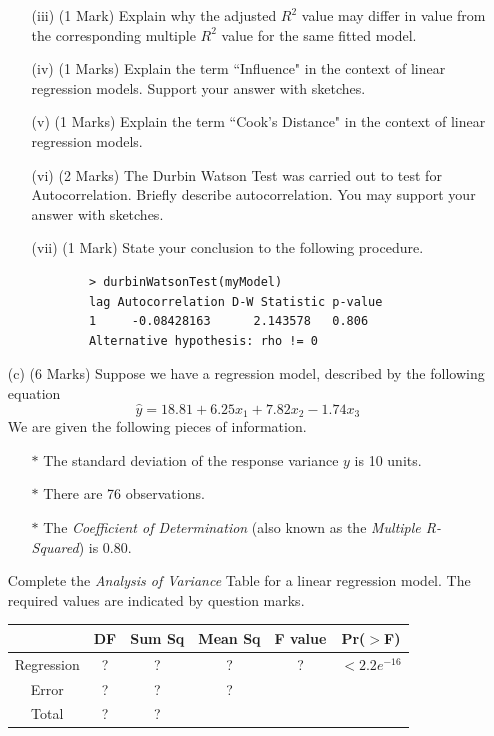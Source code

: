 \documentclass[a4paper,12pt]{article}
\begin{document}
\begin{itemize}
\begin{itemize}
	\item[(iii)] (1 Mark) Explain why the adjusted $R^2$ value may differ in value from the corresponding multiple $R^2$ value for the same fitted model.
	
	
	\item[(iv)] (1 Marks) Explain the term ``Influence" in the context of linear regression models. Support your answer with sketches.
	\item[(v)] (1 Marks) Explain the  term ``Cook's Distance" in the context of linear regression models. 
	
	
	
	\item[(vi)] (2 Marks)  The Durbin Watson Test was carried out to test for Autocorrelation. Briefly describe autocorrelation. You may support your answer with sketches.
	\item[(vii)] (1 Mark) State your conclusion to the following procedure.
	\begin{framed}
		\begin{verbatim}
		> durbinWatsonTest(myModel)
		lag Autocorrelation D-W Statistic p-value
		1     -0.08428163      2.143578   0.806
		Alternative hypothesis: rho != 0
		\end{verbatim}
	\end{framed}
\newpage
\end{itemize}
\item[(c)] (6 Marks) Suppose we have a regression model, described by the following equation
\[ \hat{y} = 18.81 + 6.25x_1 + 7.82 x_2 - 1.74 x_3\]
We are given the following pieces of information.
\begin{itemize}
\item[$\ast$] The standard deviation of the response variance $y$ is 10 units.
\item[$\ast$] There are 76 observations.
\item[$\ast$] The \textit{Coefficient of Determination} (also known as the \textit{Multiple R-Squared}) is 0.80.
\end{itemize}
Complete the \textit{Analysis of Variance} Table for a linear regression model.
The required values are indicated by question marks.

\begin{center}
	\begin{tabular}{|c|c|c|c|c|c|} \hline
		\phantom{makespace}	& DF & 	Sum Sq &	Mean Sq &	F value &   	Pr($>$F)    \\ \hline
		Regression &  \phantom{make}?\phantom{make} &	? &	? &	 ? &	$< 2.2e^{-16}$ \\ \hline
		Error  & ? &	? &  	?   &            &       \\ \hline
		Total  & ?  &	? &  \phantom{makespace}	  &   \phantom{makespace}         &    \phantom{makespace}    \\ \hline
	\end{tabular} 
\end{center}






\end{itemize}
\bigskip
\end{document}
